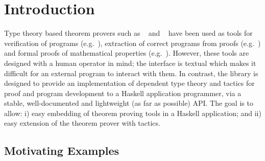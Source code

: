 \section{Introduction}


Type theory based theorem provers such as \Coq{}~\cite{coq-manual} and
\Agda{}~\cite{agda} have been used as tools for verification of programs
(e.g.~\cite{leroy-compiler,why-tool,mckinna-expr}), extraction of
correct programs from proofs (e.g.~\cite{extraction-coq,large-extraction})
and formal proofs of mathematical properties
(e.g.~\cite{fta,four-colour}).  However, these tools are designed with a
human operator in mind; the interface is textual which makes it
difficult for an external program to interact with them. 
In contrast, the \Ivor{} library is designed to provide an
implementation of dependent type theory and tactics for proof and
program development to a Haskell application programmer, via a stable,
well-documented and lightweight (as far as possible) API. The goal is
to allow: i) easy embedding of theorem proving tools in a Haskell
application; and ii) easy extension of the theorem prover with
 tactics.





\subsection{Motivating Examples}

